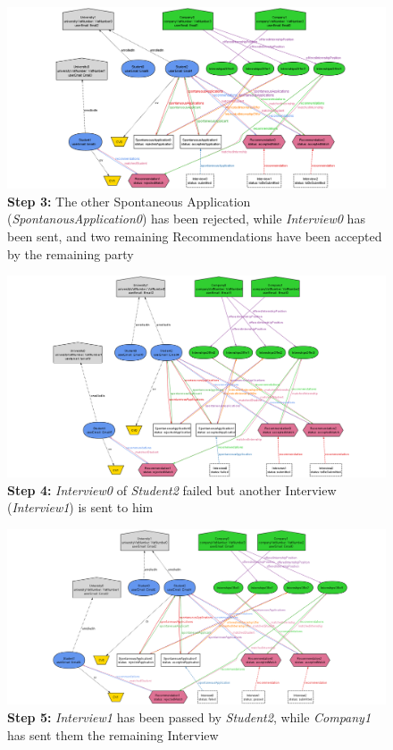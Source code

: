 \begin{figure}[H]
    \hspace{-2.5cm}
    \includegraphics[width=1.3\linewidth]{Latex/Images/Alloy/3.png}
    \caption*{\textbf{Step 3:} The other Spontaneous Application (\textit{SpontanousApplication0}) has been rejected, while \textit{Interview0} has been sent, and two remaining Recommendations have been accepted by the remaining party }
    \label{fig:ALIMG3}
\end{figure}
\begin{figure}[H]
    \hspace{-2.5cm}
    \includegraphics[width=1.3\linewidth]{Latex/Images/Alloy/4.png}
    \caption*{\textbf{Step 4:} \textit{Interview0} of \textit{Student2} failed but another Interview (\textit{Interview1}) is sent to him}
    \label{fig:ALIMG4}
\end{figure}
\begin{figure}[H]
    \hspace{-2.5cm}
    \includegraphics[width=1.3\linewidth]{Latex/Images/Alloy/5.png}
    \caption*{\textbf{Step 5:} \textit{Interview1} has been passed by \textit{Student2}, while \textit{Company1} has sent them the remaining Interview}
    \label{fig:ALIMG5}
\end{figure}


